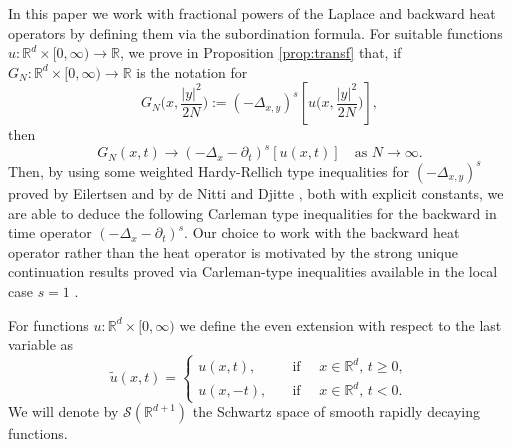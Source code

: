 \documentclass[11pt, twoside, notitlepage]{amsart}
\newcommand\R{\mathbb{R}}
\numberwithin{equation}{section}
\begin{document}
In this paper we work with fractional powers of the Laplace and backward heat operators by defining them via the subordination formula. For suitable functions $u:\R^d\times [0,\infty) \to \R$, we prove  in Proposition \ref{prop:transf} that,
if $G_N:\R^d \times [0,\infty) \to \R$ is  the notation for
  $$G_N\big(x, \frac{|y|^2}{2N}  \big):= (-\Delta_{x,y})^s \left[ u\big(x,\frac{|y|^2}{2N}\big)  \right] ,$$ then
  $$G_{N} (x,t) \rightarrow  ( -\Delta_x-\partial_t)^{s} [u(x,t)] \quad \text{as }N\to \infty. $$
Then, by using some weighted Hardy-Rellich type inequalities  for $(-\Delta_{x,y})^s$ proved by Eilertsen \cite{EilertsenJFA2001}  and by de Nitti and Djitte \cite{DeNitti-FracIneq-2024}, both with explicit constants, we are able to deduce the following Carleman type inequalities for  the backward in time  operator $( -\Delta_x-\partial_t)^s$. Our choice to work with the backward heat operator rather than the heat operator is motivated by the strong unique continuation results proved via Carleman-type inequalities available in the local case $s=1$ \cite{EscauriazaDuke2000,FernandezCPDEs2003}.



For functions $u : \R^d \times [0,\infty)$ we define the even extension with respect to the last variable as
\begin{equation}\label{even-extension}
 \tilde{u}(x,t)=  \begin{cases}
                     u(x,t),& \quad  \mbox{if }  \quad x\in \R^d, \,  t\ge 0,  \\
                     u(x,-t), &  \quad  \mbox{if } \quad   x\in \R^d,\,  t< 0.
                   \end{cases}
\end{equation}
We will denote by $\mathcal{S}(\R^{d+1})$ the Schwartz space of smooth rapidly decaying functions.
\end{document}
